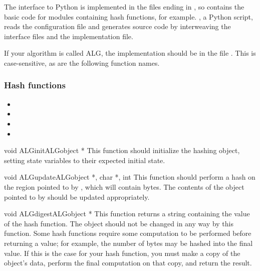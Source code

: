 \documentclass{howto}
\begin{document}
The interface to Python is implemented in the files ending in
, so  contains the basic code for modules
containing hash functions, for example.  , a Python
script, reads the configuration file and generates source code by
interweaving the interface files and the implementation file.

If your algorithm is called ALG, the implementation should be in the
file . This is case-sensitive, as are the following function
names.  

\subsubsection{Hash functions}

\begin{itemize}
\item {}
\item {}
\item {}
\item {}
\end{itemize}

\begin{funcdesc}{void ALGinit}{\rm ALGobject *}
This function should initialize the hashing object, setting 
state variables to their expected initial state.
\end{funcdesc}

\begin{funcdesc}{void ALGupdate}{\rm ALGobject *, 
char *, int }
This function should perform a hash on the region pointed to by
, which will contain  bytes.  The contents of
the object pointed to by  should be updated appropriately. 
\end{funcdesc}

\begin{funcdesc}{void ALGdigest}{\rm ALGobject *}
This function returns a string containing the value of the hash
function.  The object should not be changed in any way by this
function.  Some hash functions require some computation to be
performed before returning a value; for example, the number of bytes
may be hashed into the final value.  If this is the case for your hash
function, you must make a copy of the object's data, perform the final
computation on that copy, and return the result.
\end{funcdesc}
\end{document}
